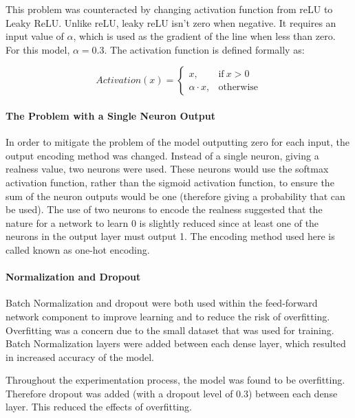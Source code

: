 \documentclass[12pt,a4paper]{article}
\begin{document}
                This problem was counteracted by changing activation function from reLU to Leaky ReLU. Unlike reLU, leaky reLU isn't zero when negative. It requires an input value of $\alpha$, which is used as the gradient of the line when less than zero. \cite{liu_liu_2017} For this model, $\alpha=0.3$. The activation function is defined formally as:
                
                
                \begin{equation}
                    Activation(x) =
                    \begin{cases}
                    x, & \text{if}\ x>0 \\
                    \alpha \cdot x, & \text{otherwise}
                    \end{cases}
                \end{equation}

                \paragraph{The Problem with a Single Neuron Output}
                In order to mitigate the problem of the model outputting zero for each input, the output encoding method was changed. Instead of a single neuron, giving a realness value, two neurons were used.
                These neurons would use the softmax activation function, rather than the sigmoid activation function, to ensure the sum of the neuron outputs would be one (therefore giving a probability that can be used).
                The use of two neurons to encode the realness suggested that the nature for a network to learn 0 is slightly reduced since at least one of the neurons in the output layer must output 1. The encoding method used here
                is called known as one-hot encoding.

                \paragraph{Normalization and Dropout}
                Batch Normalization and dropout were both used within the feed-forward network component to improve learning and to reduce the risk of overfitting. Overfitting was a concern due to the small dataset that was used for training.
                Batch Normalization layers were added between each dense layer, which resulted in increased accuracy of the model.

                Throughout the experimentation process, the model was found to be overfitting. Therefore dropout was added (with a dropout level of 0.3) between each dense layer. This reduced the effects of overfitting.
\end{document}
